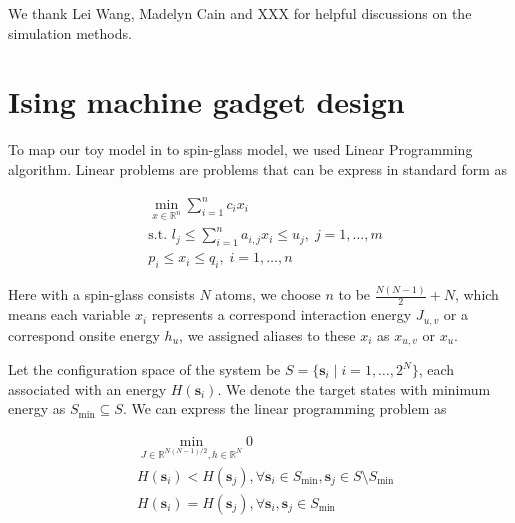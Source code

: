 \documentclass[twocolumn,superscriptaddress,english,showpacs,longbibliography]{revtex4-2}
\begin{document}
\begin{acknowledgments}
    We thank Lei Wang, Madelyn Cain and XXX for helpful discussions on the simulation methods.
\end{acknowledgments}

%


\appendix

\section{Ising machine gadget design}\label{sec:gadget-design}
To map our toy model in  to
spin-glass model, we used Linear Programming algorithm.
Linear problems are problems that can be express in standard form as

\begin{equation}
    \begin{split}
        &\min_{x \in \mathbb{R}^n} \sum_{i=1}^n c_ix_i\\
        &\text{s.t. } l_j \leq \sum_{i=1}^n a_{i,j}x_i \leq u_j, \; j=1,\ldots,m\\
        &p_i \leq x_i \leq q_i, \; i=1,\ldots, n
    \end{split}
\end{equation}

Here with a spin-glass consists $N$ atoms, we choose $n$ to be $\frac{N(N-1)}{2} + N$, which means each variable $x_i$ represents a correspond interaction energy $J_{u, v}$ or a correspond onsite energy $h_u$, we assigned aliases to these $x_i$ as $x_{u,v}$ or $x_{u}$.

Let the configuration space of the system be $S = \{\mathbf s_i\mid i=1,\ldots, 2^N\}$, each associated with an energy $H(\mathbf s_i)$. We denote the target states with minimum energy as $S_{\text{min}} \subseteq S$. We can express the linear programming problem as

\begin{equation}
    \begin{split}
        &\min_{J \in \mathbb{R}^{N(N{-}1)/2}, h\in \mathbb{R}^N} 0\\
        &H(\mathbf s_i) < H(\mathbf s_j), \forall \mathbf s_i \in S_{\text{min}}, \mathbf s_j \in S \setminus S_{\text{min}}\\
        &H(\mathbf s_i) = H(\mathbf s_j), \forall \mathbf s_i, \mathbf s_j \in S_{\text{min}}
    \end{split}
\end{equation}
\end{document}
